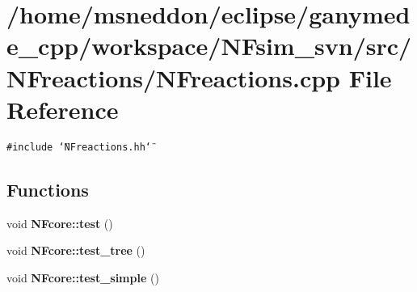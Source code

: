 \section{/home/msneddon/eclipse/ganymede\_\-cpp/workspace/NFsim\_\-svn/src/NFreactions/NFreactions.cpp File Reference}
\label{NFreactions_8cpp}


{\tt \#include \char`\"{}NFreactions.hh\char`\"{}}\par
\subsection*{Functions}
\begin{CompactItemize}
\item 
void {\bf NFcore::test} ()
\item 
void {\bf NFcore::test\_\-tree} ()
\item 
void {\bf NFcore::test\_\-simple} ()
\end{CompactItemize}
